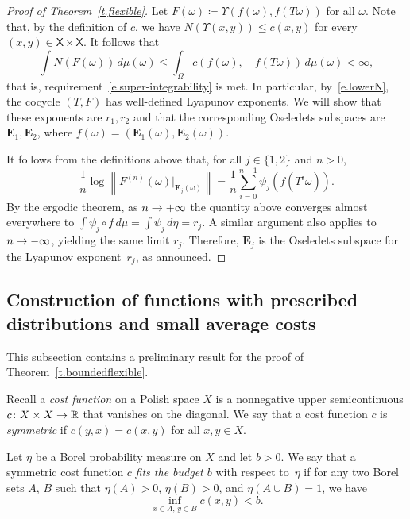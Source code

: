 \documentclass[AHL,Unicode,longabstracts,published]{cedram}
\newcommand{\R}{\mathbb{R}}
\newcommand{\E}{\mathbf{E}}
\newcommand{\sfX}{\mathsf{X}}
\renewcommand*{\to}{\mathchoice{\longrightarrow}{\rightarrow}{\rightarrow}{\rightarrow}}
\newcommand{\R}{\mathbb{R}}
\begin{document}
\begin{proof}[Proof of Theorem~\ref{t.flexible}]
Let $F(\omega) \coloneqq \Upsilon(f(\omega),f(T \omega))$ for all $\omega$. Note that, by the definition of $c$, we have $N(\Upsilon(x,y)) \le c(x,y)$ for every $(x,y) \in \sfX \times \sfX$. It follows that
\begin{equation}
\int N(F(\omega)) \, d\mu(\omega) \le \int_\Omega c(f(\omega),\quad f(T \omega)) \, d\mu(\omega) < \infty,
\end{equation}
that is, requirement~\eqref{e.super-integrability} is met. In particular, by~\eqref{e.lowerN}, the cocycle $(T,F)$ has well-defined Lyapunov exponents. We will show that these exponents are $r_1, r_2$ and that the corresponding Oseledets subspaces are $\E_1,\E_2$, where $f(\omega) = (\E_1(\omega),\E_2(\omega))$.

It follows from the definitions above that, for all $j \in \{1,2\}$ and $n>0$,
\begin{equation}
\frac{1}{n}\log \left\|F^{(n)}(\omega)|_{ \E_j(\omega)}\right\| =
\frac{1}{n} \sum_{i = 0}^{n-1} \psi_j\left(f(T^i \omega)\right).
\end{equation}
By the ergodic theorem, as $n \to +\infty$ the quantity above converges almost everywhere to $\int \psi_j \circ f \, d\mu = \int \psi_j \, d\eta = r_j$. A similar argument also applies to $n \to -\infty$, yielding the same limit $r_j$. Therefore, $\E_j$ is the Oseledets subspace for the Lyapunov exponent~$r_j$, as announced.
\end{proof}


\subsection{Construction of functions with prescribed distributions and small average costs}

This subsection contains a preliminary result for the proof of Theorem~\ref{t.boundedflexible}.

Recall a \emph{cost function} on a Polish space $X$ is a nonnegative upper semicontinuous $c \colon X \times X \to \R$ that vanishes on the diagonal. We say that a cost function $c$ is \emph{symmetric} if $c(y,x) = c(x,y)$ for all $x,y \in X$.

Let $\eta$ be a Borel probability measure on $X$ and let $b>0$. We say that a symmetric cost function $c$ \emph{fits the budget $b$} with respect to~$\eta$ if for any two Borel sets $A$, $B$ such that $\eta(A)>0$, $\eta(B)>0$, and $\eta(A \cup B) = 1$, we have
\begin{equation}
\inf_{x \in A, \, y \in B} c(x,y) < b.
\end{equation}
\end{document}
